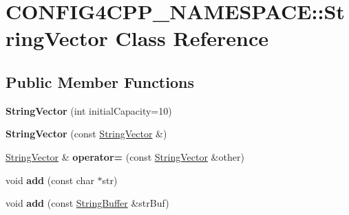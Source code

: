 \hypertarget{classCONFIG4CPP__NAMESPACE_1_1StringVector}{\section{C\-O\-N\-F\-I\-G4\-C\-P\-P\-\_\-\-N\-A\-M\-E\-S\-P\-A\-C\-E\-:\-:String\-Vector Class Reference}
\label{classCONFIG4CPP__NAMESPACE_1_1StringVector}
}
\subsection*{Public Member Functions}
\begin{DoxyCompactItemize}
\item 
\hypertarget{classCONFIG4CPP__NAMESPACE_1_1StringVector_a39d642158823a32932ca46bc3b538753}{{\bfseries String\-Vector} (int initial\-Capacity=10)}\label{classCONFIG4CPP__NAMESPACE_1_1StringVector_a39d642158823a32932ca46bc3b538753}

\item 
\hypertarget{classCONFIG4CPP__NAMESPACE_1_1StringVector_a9e055a92820fe513427244d852672896}{{\bfseries String\-Vector} (const \hyperlink{classCONFIG4CPP__NAMESPACE_1_1StringVector}{String\-Vector} \&)}\label{classCONFIG4CPP__NAMESPACE_1_1StringVector_a9e055a92820fe513427244d852672896}

\item 
\hypertarget{classCONFIG4CPP__NAMESPACE_1_1StringVector_a285a7f9ad0b9d8ad09edd0ac4eb846ab}{\hyperlink{classCONFIG4CPP__NAMESPACE_1_1StringVector}{String\-Vector} \& {\bfseries operator=} (const \hyperlink{classCONFIG4CPP__NAMESPACE_1_1StringVector}{String\-Vector} \&other)}\label{classCONFIG4CPP__NAMESPACE_1_1StringVector_a285a7f9ad0b9d8ad09edd0ac4eb846ab}

\item 
\hypertarget{classCONFIG4CPP__NAMESPACE_1_1StringVector_a9b0199d94bd9531ddce7184638c320fa}{void {\bfseries add} (const char $\ast$str)}\label{classCONFIG4CPP__NAMESPACE_1_1StringVector_a9b0199d94bd9531ddce7184638c320fa}

\item 
\hypertarget{classCONFIG4CPP__NAMESPACE_1_1StringVector_a410c5d438a50470934f15e169ca4c1e9}{void {\bfseries add} (const \hyperlink{classCONFIG4CPP__NAMESPACE_1_1StringBuffer}{String\-Buffer} \&str\-Buf)}\label{classCONFIG4CPP__NAMESPACE_1_1StringVector_a410c5d438a50470934f15e169ca4c1e9}


\end{DoxyCompactItemize}
